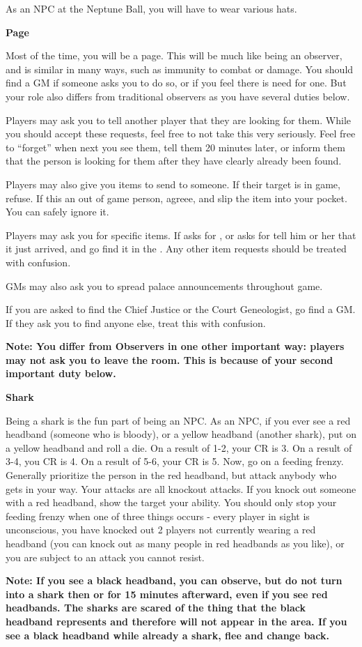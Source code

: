 \documentclass[green]{NeptuneBall}
\begin{document}
\name{\gNPC{}}

As an NPC at the Neptune Ball, you will have to wear various hats.

{\bf Page}

Most of the time, you will be a page. This will be much like being an observer, and is similar in many ways, such as immunity to combat or damage. You should find a GM if someone asks you to do so, or if you feel there is need for one. But your role also differs from traditional observers as you have several duties below.

Players may ask you to tell another player that they are looking for them. While you should accept these requests, feel free to not take this very seriously. Feel free to "`forget"' when next you see them, tell them 20 minutes later, or inform them that the person is looking for them after they have clearly already been found. 

Players may also give you items to send to someone. If their target is in game, refuse. If this an out of game person, agreee, and slip the item into your pocket. You can safely ignore it.

Players may ask you for specific items. If \cPriest{} asks for \iCipherLetter{}, or \cSpy{} asks for \iScroll{} tell him or her that it just arrived, and go find it in the \pGM{}. Any other item requests should be treated with confusion.

GMs may also ask you to spread palace announcements throughout game.

If you are asked to find the Chief Justice or the Court Geneologist, go find a GM. If they ask you to find anyone else, treat this with confusion.

{\bf Note: You differ from Observers in one other important way: players may not ask you to leave the room. This is because of your second important duty below.}

{\bf Shark}

Being a shark is the fun part of being an NPC. As an NPC, if you ever see a red headband (someone who is bloody), or a yellow headband (another shark), put on a yellow headband and roll a die. On a result of 1-2, your CR is 3. On a result of 3-4, you CR is 4. On a result of 5-6, your CR is 5. Now, go on a feeding frenzy. Generally prioritize the person in the red headband, but attack anybody who gets in your way. Your attacks are all knockout attacks. If you knock out someone with a red headband, show the target your \aShark{} ability. You should only stop your feeding frenzy when one of three things occurs - every player in sight is unconscious, you have knocked out 2 players not currently wearing a red headband (you can knock out as many people in red headbands as you like), or you are subject to an attack you cannot resist. 

{\bf Note: If you see a black headband, you can observe, but do not turn into a shark then or for 15 minutes afterward, even if you see red headbands. The sharks are scared of the thing that the black headband represents and therefore will not appear in the area. If you see a black headband while already a shark, flee and change back.}
\end{document}
